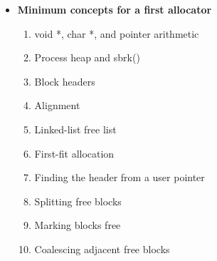 \documentclass{report}
\begin{document}
\begin{itemize}
\begin{enumerate}
                    \item double free
                    \item use after free
                    \item buffer overflow
                    \item freeing invalid pointers
                    \item metadata corruption
                    \item returning unaligned pointers
                    \item overlapping allocations
                    \item losing blocks from the free list
                \end{enumerate}
                You should also write internal consistency checks.
                \bigbreak \noindent 
                \begin{cppcode}
                void heap_check(void);
                \end{cppcode}
                \bigbreak \noindent 
                This can verify that block sizes, free-list links, and address ranges make sense.
            \item \textbf{Minimum concepts for a first allocator}
                \begin{enumerate}
                    \item void *, char *, and pointer arithmetic
                    \item Process heap and sbrk()
                    \item Block headers
                    \item Alignment
                    \item Linked-list free list
                    \item First-fit allocation
                    \item Finding the header from a user pointer
                    \item Splitting free blocks
                    \item Marking blocks free
                    \item Coalescing adjacent free blocks
                \end{enumerate}

        \end{itemize}
\end{document}
